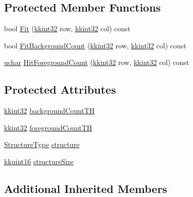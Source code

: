 \subsection*{Protected Member Functions}
\begin{DoxyCompactItemize}
\item 
bool \hyperlink{class_k_k_b_1_1_morph_op_struct_aefad7a97bccb2aa369c0923525fcfe38}{Fit} (\hyperlink{namespace_k_k_b_a8fa4952cc84fda1de4bec1fbdd8d5b1b}{kkint32} row, \hyperlink{namespace_k_k_b_a8fa4952cc84fda1de4bec1fbdd8d5b1b}{kkint32} col) const 
\item 
bool \hyperlink{class_k_k_b_1_1_morph_op_struct_a0c5d2561123dae707a5a7223f6c78882}{Fit\+Background\+Count} (\hyperlink{namespace_k_k_b_a8fa4952cc84fda1de4bec1fbdd8d5b1b}{kkint32} row, \hyperlink{namespace_k_k_b_a8fa4952cc84fda1de4bec1fbdd8d5b1b}{kkint32} col) const 
\item 
\hyperlink{namespace_k_k_b_ace9969169bf514f9ee6185186949cdf7}{uchar} \hyperlink{class_k_k_b_1_1_morph_op_struct_a4b9e013e6850f097999d72175ded3f85}{Hit\+Foreground\+Count} (\hyperlink{namespace_k_k_b_a8fa4952cc84fda1de4bec1fbdd8d5b1b}{kkint32} row, \hyperlink{namespace_k_k_b_a8fa4952cc84fda1de4bec1fbdd8d5b1b}{kkint32} col) const 
\end{DoxyCompactItemize}
\subsection*{Protected Attributes}
\begin{DoxyCompactItemize}
\item 
\hyperlink{namespace_k_k_b_a8fa4952cc84fda1de4bec1fbdd8d5b1b}{kkint32} \hyperlink{class_k_k_b_1_1_morph_op_struct_a7c4f6928cb355035d1fb3aa5ddac2601}{background\+Count\+TH}
\item 
\hyperlink{namespace_k_k_b_a8fa4952cc84fda1de4bec1fbdd8d5b1b}{kkint32} \hyperlink{class_k_k_b_1_1_morph_op_struct_a2f707b6f25d89d1aa84ed826a94ee64d}{foreground\+Count\+TH}
\item 
\hyperlink{class_k_k_b_1_1_morph_op_a09e4aff7e81327849855ff72082d85b3}{Structure\+Type} \hyperlink{class_k_k_b_1_1_morph_op_struct_ad179451936cbbe609f930605eda869bc}{structure}
\item 
\hyperlink{namespace_k_k_b_aa8c7d4d30381c8a0b6fce68974a9c8a9}{kkuint16} \hyperlink{class_k_k_b_1_1_morph_op_struct_a3aeaf4c1bde185cc080f684ee74c237b}{structure\+Size}
\end{DoxyCompactItemize}
\subsection*{Additional Inherited Members}


